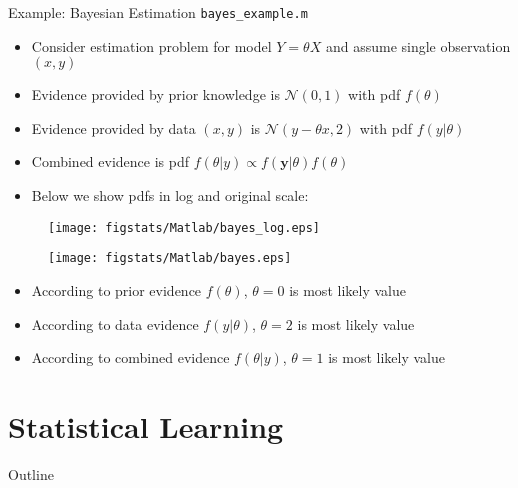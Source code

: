 \documentclass[9pt]{beamer}
\begin{document}
%
\begin{frame}{Example: Bayesian Estimation \footnotesize{\texttt{bayes\_example.m}}}

\begin{itemize}
\item Consider estimation problem for model $Y=\theta X$ and assume single observation $(x,y)$
\item Evidence provided by prior knowledge is $\mathcal{N}(0,1)$ with pdf $f(\theta)$
\item Evidence provided by data $(x,y)$ is $\mathcal{N}(y-\theta x,2)$ with pdf $f(y|\theta)$
\item Combined evidence is pdf $f(\theta|y)\propto f(\mathbf{y}|\theta)f(\theta)$
\item Below we show pdfs in log and original scale:
\end{itemize}

\begin{figure}[!htb]
    \centering
	\texttt{[image: figstats/Matlab/bayes\_log.eps]}
\end{figure}
\vspace{-0.2in}
\begin{figure}[!htb]
    \centering
	\texttt{[image: figstats/Matlab/bayes.eps]}
\end{figure}
\pause
\begin{itemize}
\item According to prior evidence $f(\theta)$, $\theta=0$ is most likely value
\item According to data evidence $f(y|\theta)$, $\theta=2$ is most likely value 
\item According to combined evidence $f(\theta|y)$, $\theta=1$ is most likely value 
\end{itemize}

\end{frame}

\section{Statistical Learning}
\begin{frame}{Outline}
\tableofcontents[currentsection]
\end{frame}
\end{document}
